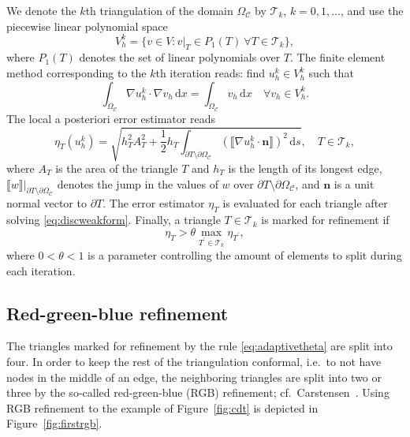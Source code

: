 \documentclass[12pt]{rmstyle}
\begin{document}
We denote the \(k\)th triangulation of the
domain \(\Omega_{\mathcal{C}}\) by \(\mathcal{T}_k\), \(k=0,1,\dots\), and
use the piecewise linear polynomial space
$$V_h^k = \{ v \in V : v|_T \in P_1(T)~\forall T \in \mathcal{T}_k \},$$
where $P_1(T)$ denotes the set of linear polynomials over $T$.
The finite element method corresponding to the \(k\)th iteration reads:
find \(u_h^k \in V_h^k\) such that
\begin{equation}
   \label{eq:discweakform}
   \int_{\Omega_{\mathcal{C}}} \nabla u_h^k \cdot \nabla v_h \,\mathrm{d}x = \int_{\Omega_{\mathcal{C}}} v_h\,\mathrm{d}x \quad \forall v_h \in V_h^k.
\end{equation}
The local a posteriori error estimator
reads
\begin{equation}
        \eta_T(u_h^k) = \sqrt{h_T^2 A_T^2 + \frac12 h_T \int_{\partial T \setminus \partial \Omega_{\mathcal{C}}} (\llbracket \nabla u_h^k \cdot \boldsymbol{n} \rrbracket)^2 \,\mathrm{d}s}, \quad T \in \mathcal{T}_k,
\end{equation}
where $A_T$ is the area of the triangle $T$ and $h_T$ is the length of its longest edge, $\llbracket w \rrbracket |_{\partial T \setminus \partial \Omega_{\mathcal{C}}}$ denotes the jump in the values of
$w$ over $\partial T \setminus \partial \Omega_{\mathcal{C}}$, and $\boldsymbol{n}$ is a unit normal vector to
$\partial T$.
The error estimator $\eta_T$ is evaluated for each triangle
after solving \eqref{eq:discweakform}.
Finally, a triangle $T \in \mathcal{T}_k$ is marked for refinement if
\begin{equation}
  \label{eq:adaptivetheta}
   \eta_T > \theta \max_{T^\prime \in \mathcal{T}_k} \eta_{T^\prime},
\end{equation}
where $0 < \theta < 1$ is a parameter controlling the amount
of elements to split during each iteration. \cite{Verf_rth_2013}

\subsection{Red-green-blue refinement}
\label{sec:rgb}

The triangles marked for refinement by the rule \eqref{eq:adaptivetheta} are
split into four.  In order to keep the rest of the triangulation conformal,
i.e.~to not have nodes in the middle of an edge, the neighboring triangles
are split into two or three by the so-called red-green-blue (RGB) refinement;
cf.~Carstensen~\cite{carstensen2004adaptive}.  Using RGB refinement to the
example of Figure~\ref{fig:cdt} is depicted in Figure~\ref{fig:firstrgb}.
\end{document}
